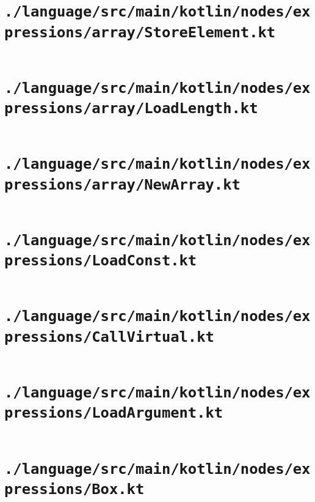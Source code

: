 \documentclass[a4paper, 11pt]{report}
\begin{document}
    \section{\lstinline{./language/src/main/kotlin/nodes/expressions/array/StoreElement.kt}}
    \inputminted{kotlin}{./language/src/main/kotlin/nodes/expressions/array/StoreElement.kt}


    \section{\lstinline{./language/src/main/kotlin/nodes/expressions/array/LoadLength.kt}}
    \inputminted{kotlin}{./language/src/main/kotlin/nodes/expressions/array/LoadLength.kt}


    \section{\lstinline{./language/src/main/kotlin/nodes/expressions/array/NewArray.kt}}
    \inputminted{kotlin}{./language/src/main/kotlin/nodes/expressions/array/NewArray.kt}


    \section{\lstinline{./language/src/main/kotlin/nodes/expressions/LoadConst.kt}}
    \inputminted{kotlin}{./language/src/main/kotlin/nodes/expressions/LoadConst.kt}


    \section{\lstinline{./language/src/main/kotlin/nodes/expressions/CallVirtual.kt}}
    \inputminted{kotlin}{./language/src/main/kotlin/nodes/expressions/CallVirtual.kt}


    \section{\lstinline{./language/src/main/kotlin/nodes/expressions/LoadArgument.kt}}
    \inputminted{kotlin}{./language/src/main/kotlin/nodes/expressions/LoadArgument.kt}


    \section{\lstinline{./language/src/main/kotlin/nodes/expressions/Box.kt}}
    \inputminted{kotlin}{./language/src/main/kotlin/nodes/expressions/Box.kt}
\end{document}
